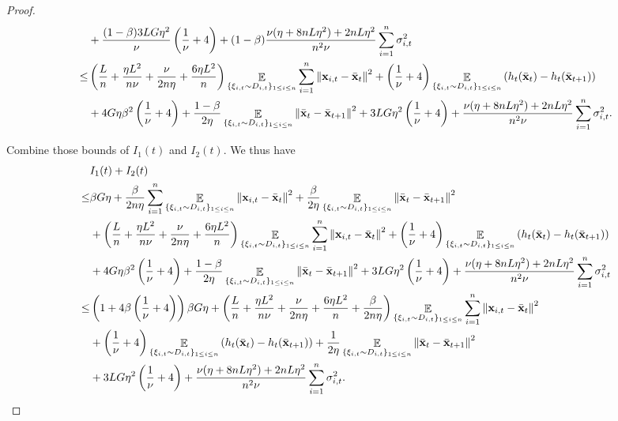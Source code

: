 \documentclass{article}
\begin{document}
\begin{proof}
\begin{align}
& + \frac{(1-\beta)3LG\eta^2}{\nu} \left(  \frac{1}{\nu} + 4  \right)  + (1-\beta)\frac{\nu(\eta + 8nL\eta^2) + 2nL\eta^2}{n^2\nu} \sum_{i=1}^n\sigma_{i,t}^2 \\ \nonumber
\le &  \left(  \frac{L}{n} + \frac{\eta L^2}{n\nu} + \frac{\nu}{2n\eta} + \frac{6\eta L^2}{n}  \right)\mathop{\mathbb{E}}_{ \{\xi_{i,t} \sim D_{i,t}\}_{1\le i \le n} }\sum_{i=1}^n\left\lVert{\bf x}_{i,t} - \bar{{\bf x}}_t \right\rVert^2  + \left( \frac{1}{\nu} + 4 \right)\mathop{\mathbb{E}}_{ \{\xi_{i,t} \sim D_{i,t}\}_{1\le i \le n} } \left( h_t(\bar{{\bf x}}_t) - h_t(\bar{{\bf x}}_{t+1}) \right)\\ \nonumber 
&+  4G\eta\beta^2\left( \frac{1}{\nu} + 4 \right) +  \frac{1-\beta}{2\eta} \mathop{\mathbb{E}}_{ \{\xi_{i,t} \sim D_{i,t}\}_{1\le i \le n} }\left\lVert \bar{{\bf x}}_t - \bar{{\bf x}}_{t+1}\right\rVert^2   + 3LG\eta^2 \left(  \frac{1}{\nu} + 4  \right)  + \frac{\nu(\eta + 8nL\eta^2) + 2nL\eta^2}{n^2\nu} \sum_{i=1}^n\sigma_{i,t}^2.
\end{align}





Combine those bounds of $I_1(t)$ and $I_2(t)$. We thus have
\begin{align}
\nonumber
& I_1(t) + I_2(t) \\ \nonumber 
\le & \beta G \eta + \frac{\beta}{2n\eta }\sum_{i=1}^n \mathop{\mathbb{E}}_{ \{\xi_{i,t} \sim D_{i,t}\}_{1\le i \le n} }\left\lVert{\bf x}_{i,t} - \bar{{\bf x}}_t\right\rVert^2 + \frac{\beta }{2\eta } \mathop{\mathbb{E}}_{ \{\xi_{i,t} \sim D_{i,t}\}_{1\le i \le n} }\left\lVert\bar{{\bf x}}_t - \bar{{\bf x}}_{t+1}\right\rVert^2 \\ \nonumber
& +  \left(  \frac{L}{n} + \frac{\eta L^2}{n\nu} + \frac{\nu}{2n\eta} + \frac{6\eta L^2}{n}  \right)\mathop{\mathbb{E}}_{ \{\xi_{i,t} \sim D_{i,t}\}_{1\le i \le n} }\sum_{i=1}^n\left\lVert{\bf x}_{i,t} - \bar{{\bf x}}_t \right\rVert^2 + \left( \frac{1}{\nu} + 4 \right)\mathop{\mathbb{E}}_{ \{\xi_{i,t} \sim D_{i,t}\}_{1\le i \le n} } \left( h_t(\bar{{\bf x}}_t) - h_t(\bar{{\bf x}}_{t+1}) \right)\\ \nonumber 
&+  4G\eta\beta^2\left( \frac{1}{\nu} + 4 \right) +  \frac{1-\beta}{2\eta} \mathop{\mathbb{E}}_{ \{\xi_{i,t} \sim D_{i,t}\}_{1\le i \le n} }\left\lVert \bar{{\bf x}}_t - \bar{{\bf x}}_{t+1}\right\rVert^2 + 3LG\eta^2\left(  \frac{1}{\nu} + 4  \right) + \frac{\nu(\eta + 8nL\eta^2) + 2nL\eta^2}{n^2\nu} \sum_{i=1}^n\sigma_{i,t}^2\\ \nonumber
\le & \left( 1 + 4\beta\left( \frac{1}{\nu}+4 \right) \right)\beta G \eta + \left(  \frac{L}{n} + \frac{\eta L^2}{n\nu} + \frac{\nu}{2n\eta} + \frac{6\eta L^2}{n}  + \frac{\beta}{2n\eta}  \right)\mathop{\mathbb{E}}_{ \{\xi_{i,t} \sim D_{i,t}\}_{1\le i \le n} }\sum_{i=1}^n\left\lVert{\bf x}_{i,t} - \bar{{\bf x}}_t \right\rVert^2 \\ \nonumber 
&+ \left( \frac{1}{\nu} + 4 \right)\mathop{\mathbb{E}}_{ \{\xi_{i,t} \sim D_{i,t}\}_{1\le i \le n} } \left( h_t(\bar{{\bf x}}_t) - h_t(\bar{{\bf x}}_{t+1}) \right) + \frac{1}{2\eta}\mathop{\mathbb{E}}_{ \{\xi_{i,t} \sim D_{i,t}\}_{1\le i \le n} }\left\lVert \bar{{\bf x}}_t - \bar{{\bf x}}_{t+1}\right\rVert^2 \\ \nonumber 
& + 3LG\eta^2\left(  \frac{1}{\nu} + 4  \right) + \frac{\nu(\eta + 8nL\eta^2) + 2nL\eta^2}{n^2\nu} \sum_{i=1}^n\sigma_{i,t}^2.
\end{align}


\end{proof}
\end{document}
